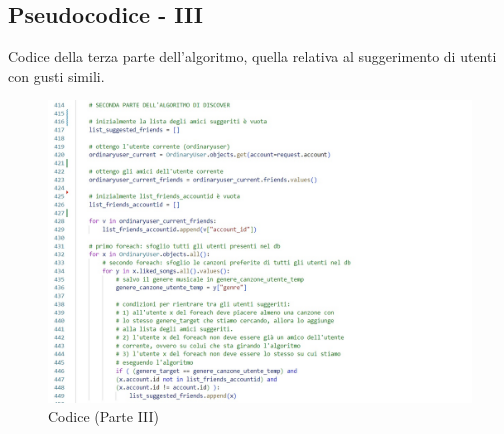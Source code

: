 \subsection{Pseudocodice - III}
Codice della terza parte dell'algoritmo, quella relativa al
suggerimento di utenti con gusti simili. 
\begin{figure}[H]
    \centering
    \includegraphics[scale=0.7]{images/alg3.jpg}
    \caption{Codice (Parte III)}
    \label{fig-codice3}
\end{figure}


